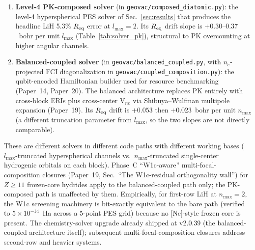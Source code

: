 \documentclass[aps,pra,twocolumn,superscriptaddress,longbibliography,floatfix]{revtex4-2}
\begin{document}
\begin{enumerate}
  \item \textbf{Level-4 PK-composed solver} (in
    \texttt{geovac/composed\_diatomic.py}): the level-4
    hyperspherical PES solver of Sec.~\ref{sec:results} that produces
    the headline LiH 5.3\% $R_{\rm eq}$ error at $l_{\max} = 2$.
    Its $R_{\rm eq}$ drift slope is
    $+0.30$--$0.37$~bohr per unit $l_{\max}$ (Table~\ref{tab:solver_pk}), structural to PK
    overcounting at higher angular channels.
  \item \textbf{Balanced-coupled solver} (in
    \texttt{geovac/balanced\_coupled.py}, with $n_e$-projected FCI
    diagonalization in \texttt{geovac/coupled\_composition.py}):
    the qubit-encoded Hamiltonian builder used for resource
    benchmarking (Paper~14, Paper~20). The balanced architecture
    replaces PK entirely with cross-block ERIs plus cross-center V$_{ne}$
    via Shibuya--Wulfman multipole expansion (Paper~19). Its
    $R_{\rm eq}$ drift is $+0.053$ then $+0.023$~bohr per unit
    $n_{\max}$ (a different truncation parameter from $l_{\max}$, so the
    two slopes are not directly comparable).
\end{enumerate}

These are different solvers in different code paths with different
working bases ($l_{\max}$-truncated hyperspherical channels vs.\
$n_{\max}$-truncated single-center hydrogenic orbitals on each block).
Phase~C ``W1c-aware'' multi-focal-composition closures (Paper~19,
Sec.~``The W1c-residual orthogonality wall'') for $Z \geq 11$ frozen-core hydrides apply
to the balanced-coupled path only; the PK-composed path is unaffected
by them. Empirically, for first-row LiH at $n_{\max} = 2$, the W1c
screening machinery is bit-exactly equivalent to the bare path
(verified to $5 \times 10^{-14}$~Ha across a 5-point PES grid) because
no [Ne]-style frozen core is present. The chemistry-solver upgrade
already shipped at v2.0.39 (the balanced-coupled architecture itself);
subsequent multi-focal-composition closures address second-row and
heavier systems.
\end{document}
